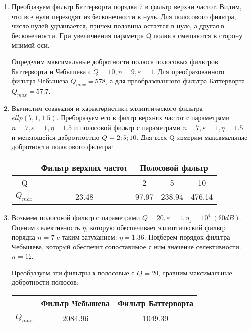 \documentclass[a4paper, 12pt]{article}%
\begin{document}
\begin{enumerate}
\item Преобразуем фильтр Баттерворта порядка 7 в фильтр верхни частот. Видим, что все нули переходят из бесконечности в нуль. Для полосового фильтра, число нулей удваивается, причем половина остается в нуле, а другая в бесконечности. При увеличнения параметра Q полюса смещаются в сторону мнимой оси.

Определим максимальные добротности полюса полосовых фильтров Баттерворта и Чебышева с $Q = 10, n = 9, \varepsilon = 1$. Для преобразованного фильтра Чебышева $Q_{max} = 578$, а для преобразованного фильтра Баттерворта $Q_{max} = 57.7$.

\item Вычислим созвездия и характеристики эллиптического фильтра $ellp(7, 1, 1.5)$. Преборазуем его в филтр верхних частот с параметрами $n = 7, \varepsilon = 1, \eta = 1.5$ и полосовой фильтр с параметрами $n = 7, \varepsilon = 1, \eta = 1.5$ и меняющейся добротностью $Q = 2;5;10$. Для всех Q измерим максимальные добротности полосового фильтра:

\begin{center}
\begin{tabular}{|c|c|c|c|c|}
\hline 
 & Фильтр верхних частот & \multicolumn{3}{c|}{Полосовой фильтр} \\ 
\hline 
Q &  & 2 & 5 & 10 \\ 
\hline 
$Q_{max}$ & 23.48 & 97.97 & 238.94 & 476.14 \\ 
\hline 
\end{tabular} 
\end{center}

\item Возьмем полосовой фильтр с параметрами $Q = 20, \varepsilon = 1, \eta_1 = 10^4 \: (80dB)$. Оценим селективность $\eta$, которую обеспечивает эллиптический фильтр порядка $n = 7$ c таким затуханием: $\eta = 1.36$. Подберем порядок фильтра Чебышева, который обеспечит сопоставимое с ним значение селективности: $n = 12$.

Преобразуем эти фильтры в полосовые с $Q = 20$, сравним максимальные добротности полюсов:


\begin{center}
\begin{tabular}{|c|c|c|}
\hline 
 & Фильтр Чебышева & Фильтр Баттерворта \\ 
\hline 
$Q_{max}$ & 2084.96 & 1049.39 \\ 
\hline 
\end{tabular} 
\end{center}

\end{enumerate}
\end{document}

